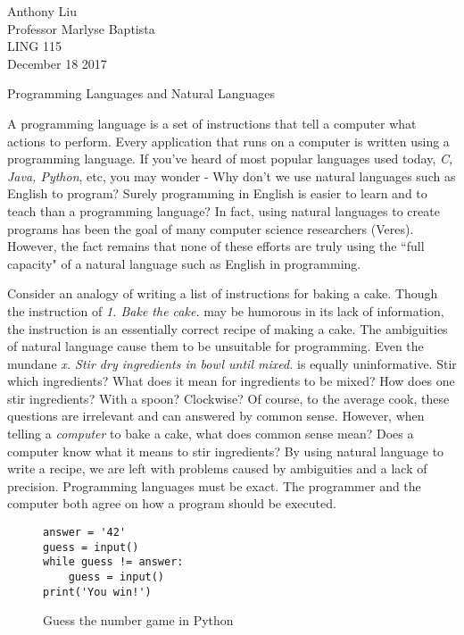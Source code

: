 \documentclass[12pt]{article}
\begin{document}
\begin{flushleft}

Anthony Liu\\
Professor Marlyse Baptista\\
LING 115\\
December 18 2017\\


\begin{center}
Programming Languages and Natural Languages
\end{center}


\setlength{\parindent}{0.5in}

A programming language is a set of instructions that tell a computer
what actions to perform. Every application that runs on a computer
is written using a programming language.
%
If you've heard of
most popular languages used today, \textit{C, Java, Python}, etc, you may
wonder - Why don't we use natural languages such as English to
program? Surely programming in English is easier to learn and to teach
than a programming language?
%
In fact, using natural languages to create programs has been the goal
of many computer science researchers (Veres). However, the fact remains
that none of these efforts are truly using the ``full capacity" of
a natural language such as English in programming.

Consider an analogy of writing a list of instructions for baking
a cake. Though the instruction of \textit{1. Bake the cake.} may be humorous
in its lack of information, the instruction is an essentially correct
recipe of making a cake. The ambiguities of natural language
cause them to be unsuitable for programming.
%
Even the mundane \textit{x. Stir dry ingredients in bowl until mixed.}
is equally uninformative. Stir which ingredients?
What does it mean for ingredients to be mixed? How does one stir ingredients?
With a spoon? Clockwise? Of course, to the average cook, these questions are
irrelevant and can answered by common sense. However, when telling a
\textit{computer} to bake a cake, what does common sense mean? Does a
computer know what it means to stir ingredients?
%
By using natural language to write a recipe, we are left with
problems caused by ambiguities and a lack of precision.
Programming languages must be exact. The programmer and the computer
both agree on how a program should be executed.

\begin{figure}[h]
\centering
\caption{Guess the number game in Python}
\begin{lstlisting}
answer = '42'
guess = input()
while guess != answer:
    guess = input()
print('You win!')
\end{lstlisting}
\label{fig:guess_number}
\end{figure}


\end{flushleft}
\end{document}
